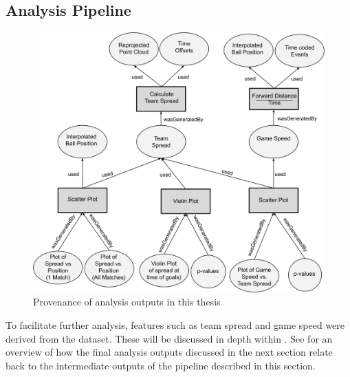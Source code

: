 \subsection{Analysis Pipeline}

\begin{figure}[H]
\centering
\includegraphics[width=\linewidth]{figs/prov/prov-analysis.png}
\caption{Provenance of analysis outputs in this thesis \notationdetails{}
\label{fig:prov-analysis}}
\end{figure}

To facilitate further analysis, features such as team spread and game speed were derived from the dataset. These will be discussed in depth within . See  for an overview of how the final analysis outputs discussed in the next section relate back to the intermediate outputs of the pipeline described in this section.
